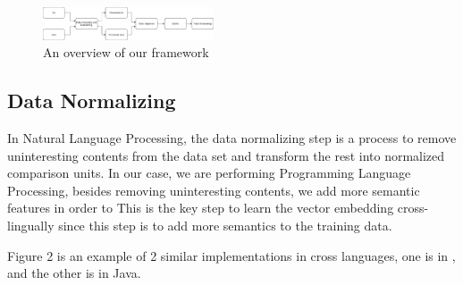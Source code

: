 \begin{figure}[t!]
	\includegraphics[width=0.45\textwidth]{steps}
	\caption{An overview of our framework}
	\label{fig:clf}
\end{figure}
 



\subsection{Data Normalizing}

In Natural Language Processing, the data normalizing step is a process to remove uninteresting contents from the data set and transform the rest into normalized comparison units. In our case, we are performing Programming Language Processing, besides removing uninteresting contents, we add more semantic features in order to 
This is the key step to learn the vector embedding cross-lingually since this step is to add more semantics to the training data. 

Figure 2 is an example of 2 similar implementations in cross languages, one is in , and the other is in Java.


